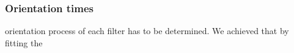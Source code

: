 \documentclass{article}
\begin{document}
\subsubsection{Orientation times}
orientation process of each filter has to be determined. We achieved that by fitting the
\end{document}
